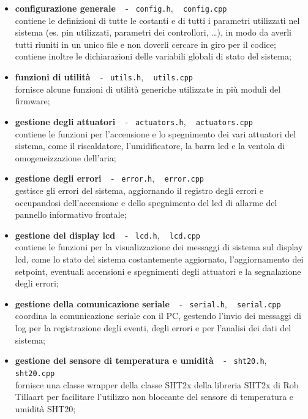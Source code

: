 \begin{itemize}
	\item \textbf{configurazione generale} ~ - ~\verb|config.h|, ~ \verb|config.cpp| \\
	contiene le definizioni di tutte le costanti e di tutti i parametri utilizzati nel sistema (es. pin utilizzati, parametri
	dei controllori, \dots), in modo da averli tutti riuniti in un unico file e non doverli cercare in giro	per il codice;
	contiene inoltre le dichiarazioni delle variabili globali di stato del sistema;
	\item \textbf{funzioni di utilità} ~ - ~\verb|utils.h|, ~ \verb|utils.cpp| \\
	fornisce alcune funzioni di utilità generiche utilizzate in più moduli del firmware;
	\item \textbf{gestione degli attuatori} ~ - ~\verb|actuators.h|, ~ \verb|actuators.cpp| \\
	contiene le funzioni per l'accensione e lo spegnimento dei vari attuatori del sistema, come il riscaldatore,
	l'umidificatore, la barra led e la ventola di omogeneizzazione dell'aria;
	\item \textbf{gestione degli errori} ~ - ~\verb|error.h|, ~ \verb|error.cpp| \\
	gestisce gli errori del sistema, aggiornando il registro degli errori e occupandosi dell'accensione e dello
	spegnimento del led di allarme del pannello informativo frontale;
	\item \textbf{gestione del display lcd} ~ - ~\verb|lcd.h|, ~ \verb|lcd.cpp| \\
	contiene le funzioni per la visualizzazione dei messaggi di sistema sul display lcd, come lo stato del sistema
	costantemente aggiornato, l'aggiornamento dei setpoint, eventuali accensioni e spegnimenti degli attuatori e
	la segnalazione degli errori;
	\item \textbf{gestione della comunicazione seriale} ~ - ~\verb|serial.h|, ~ \verb|serial.cpp| \\
	coordina la comunicazione seriale con il PC, gestendo l'invio dei messaggi di log per la registrazione degli
	eventi, degli errori e per l'analisi dei dati del sistema;
	\item \textbf{gestione del sensore di temperatura e umidità} ~ - ~\verb|sht20.h|, ~ \verb|sht20.cpp| \\
	fornisce una classe wrapper della classe SHT2x della libreria SHT2x di Rob Tillaart \cite{sht2x_library} per
	facilitare l'utilizzo non bloccante del sensore di temperatura e umidità SHT20;

\end{itemize}
